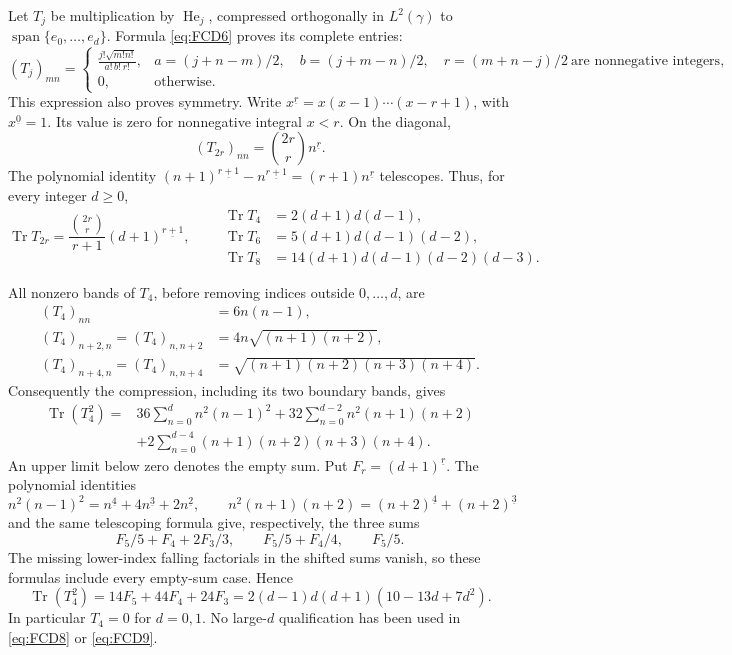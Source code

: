 Let \(T_j\) be multiplication by \(\operatorname{He}_j\), compressed
orthogonally in \(L^2(\gamma)\) to
\(\operatorname{span}\{e_0,\ldots,e_d\}\). Formula \eqref{eq:FCD6}
proves its complete entries:
\begin{equation}
 (T_j)_{mn}=
 \begin{cases}
 \displaystyle
 \frac{j!\sqrt{m!n!}}{a!\,b!\,r!},
 &
 a=(j+n-m)/2,\quad b=(j+m-n)/2,\quad r=(m+n-j)/2
       \ \text{are nonnegative integers},\\[4pt]
 0,&\text{otherwise}.
 \end{cases}
 \tag{FCD7}\label{eq:FCD7}
\end{equation}
This expression also proves symmetry. Write
\(x^{\underline r}=x(x-1)\cdots(x-r+1)\), with
\(x^{\underline0}=1\). Its value is zero for nonnegative integral
\(x<r\). On the diagonal,
\[
 (T_{2r})_{nn}=\binom{2r}{r}n^{\underline r}.
\]
The polynomial identity
\((n+1)^{\underline{r+1}}-n^{\underline{r+1}}
 =(r+1)n^{\underline r}\)
telescopes. Thus, for every integer \(d\ge0\),
\begin{equation}
 \operatorname{Tr}T_{2r}
    =\frac{\binom{2r}{r}}{r+1}(d+1)^{\underline{r+1}},
 \qquad
 \begin{split}
 \operatorname{Tr}T_4&=2(d+1)d(d-1),\\
 \operatorname{Tr}T_6&=5(d+1)d(d-1)(d-2),\\
 \operatorname{Tr}T_8&=14(d+1)d(d-1)(d-2)(d-3).
 \end{split}
 \tag{FCD8}\label{eq:FCD8}
\end{equation}

All nonzero bands of \(T_4\), before removing indices outside \(0,\ldots,d\),
are
\[
 \begin{split}
 (T_4)_{nn}&=6n(n-1),\\
 (T_4)_{n+2,n}=(T_4)_{n,n+2}
       &=4n\sqrt{(n+1)(n+2)},\\
 (T_4)_{n+4,n}=(T_4)_{n,n+4}
       &=\sqrt{(n+1)(n+2)(n+3)(n+4)} .
 \end{split}
\]
Consequently the compression, including its two boundary bands, gives
\[
 \begin{split}
 \operatorname{Tr}(T_4^2)
 ={}&36\sum_{n=0}^d n^2(n-1)^2
     +32\sum_{n=0}^{d-2}n^2(n+1)(n+2)\\
    &+2\sum_{n=0}^{d-4}(n+1)(n+2)(n+3)(n+4).
 \end{split}
\]
An upper limit below zero denotes the empty sum. Put
\(F_r=(d+1)^{\underline r}\). The polynomial identities
\[
 n^2(n-1)^2=n^{\underline4}+4n^{\underline3}+2n^{\underline2},
 \qquad
 n^2(n+1)(n+2)=(n+2)^{\underline4}+(n+2)^{\underline3}
\]
and the same telescoping formula give, respectively, the three sums
\[
 F_5/5+F_4+2F_3/3,\qquad F_5/5+F_4/4,\qquad F_5/5.
\]
The missing lower-index falling factorials in the shifted sums vanish, so
these formulas include every empty-sum case. Hence
\begin{equation}
 \boxed{\displaystyle
 \operatorname{Tr}(T_4^2)=14F_5+44F_4+24F_3
             =2(d-1)d(d+1)(10-13d+7d^2).}
 \tag{FCD9}\label{eq:FCD9}
\end{equation}
In particular \(T_4=0\) for \(d=0,1\). No large-\(d\) qualification
has been used in \eqref{eq:FCD8} or \eqref{eq:FCD9}.

